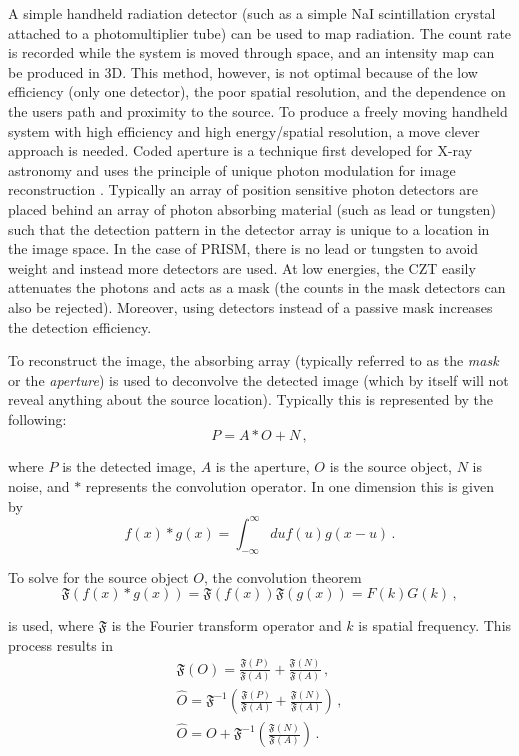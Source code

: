 \documentclass[10pt]{article}
\begin{document}
A simple handheld radiation detector (such as a simple NaI scintillation crystal attached to a photomultiplier tube) can be used to map radiation. The count rate is recorded while the system is moved through space, and an intensity map can be produced in 3D. This method, however, is not optimal because of the low efficiency (only one detector), the poor spatial resolution, and the dependence on the users path and proximity to the source. To produce a freely moving handheld system with high efficiency and high energy/spatial resolution, a move clever approach is needed. Coded aperture is a technique first developed for X-ray astronomy and uses the principle of unique photon modulation for image reconstruction \cite{FenimoreCannon1978}. Typically an array of position sensitive photon detectors are placed behind an array of photon absorbing material (such as lead or tungsten) such that the detection pattern in the detector array is unique to a location in the image space. In the case of PRISM, there is no lead or tungsten to avoid weight and instead more detectors are used. At low energies, the CZT easily attenuates the photons and acts as a mask (the counts in the mask detectors can also be rejected). Moreover, using detectors instead of a passive mask increases the detection efficiency.

To reconstruct the image, the absorbing array (typically referred to as the \emph{mask} or the \emph{aperture}) is used to deconvolve the detected image (which by itself will not reveal anything about the source location). Typically this is represented by the following:
%
\begin{equation}
	P = A \ast O + N\,,
\end{equation}

\noindent where $P$ is the detected image, $A$ is the aperture, $O$ is the source object, $N$ is noise, and $\ast$ represents the convolution operator. In one dimension this is given by
%
\begin{equation}
	f(x) \ast g(x) = \int_{-\infty}^\infty du f(u)g(x-u)\,.
\end{equation}

\noindent To solve for the source object $O$, the convolution theorem
%
\begin{equation}
	\mathfrak{F}(f(x) \ast g(x)) = \mathfrak{F}(f(x)) \mathfrak{F}(g(x)) = F(k)G(k)\,,
\end{equation}

\noindent is used, where $\mathfrak{F}$ is the Fourier transform operator and $k$ is spatial frequency. This process results in
%
\begin{align}
	\mathfrak{F}(O) = \frac{\mathfrak{F}(P)}{\mathfrak{F}(A)} + \frac{\mathfrak{F}(N)}{\mathfrak{F}(A)}\,,  \\
	\hat{O} = \mathfrak{F}^{-1}\left(\frac{\mathfrak{F}(P)}{\mathfrak{F}(A)} + \frac{\mathfrak{F}(N)}{\mathfrak{F}(A)}\right)\,, \\
	\hat{O} = O + \mathfrak{F}^{-1}\left( \frac{\mathfrak{F}(N)}{\mathfrak{F}(A)}\right)\,.
\end{align}
\end{document}
